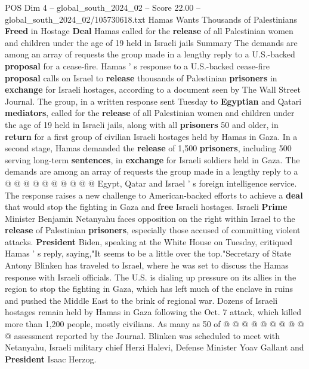 \begin{textsample}{POS Dim 4 – global\_south\_2024\_02 – Score 22.00 – global\_south\_2024\_02/105730618.txt}  \label{ex:f4_pos_077}
Hamas Wants Thousands of Palestinians \textbf{Freed} in Hostage \textbf{Deal} Hamas called for the \textbf{release} of all Palestinian women and children under the age of 19 held in Israeli jails Summary The demands are among an array of requests the group made in a lengthy reply to a U.S.-backed \textbf{proposal} for a cease-fire.
Hamas ' s response to a U.S.-backed cease-fire \textbf{proposal} calls on Israel to \textbf{release} thousands of Palestinian \textbf{prisoners} in \textbf{exchange} for Israeli hostages, according to a document seen by The Wall Street Journal.
The group, in a written response sent Tuesday to \textbf{Egyptian} and Qatari \textbf{mediators}, called for the \textbf{release} of all Palestinian women and children under the age of 19 held in Israeli jails, along with all \textbf{prisoners} 50 and older, in \textbf{return} for a first group of civilian Israeli hostages held by Hamas in Gaza.
In a second stage, Hamas demanded the \textbf{release} of 1,500 \textbf{prisoners}, including 500 serving long-term \textbf{sentences}, in \textbf{exchange} for Israeli soldiers held in Gaza.
The demands are among an array of requests the group made in a lengthy reply to a @ @ @ @ @ @ @ @ @ @ Egypt, Qatar and Israel ' s foreign intelligence service.
The response raises a new challenge to American-backed efforts to achieve a \textbf{deal} that would stop the fighting in Gaza and \textbf{free} Israeli hostages.
Israeli \textbf{Prime} Minister Benjamin Netanyahu faces opposition on the right within Israel to the \textbf{release} of Palestinian \textbf{prisoners}, especially those accused of committing violent attacks. \textbf{President} Biden, speaking at the White House on Tuesday, critiqued Hamas ' s reply, saying,"It seems to be a little over the top."Secretary of State Antony Blinken has traveled to Israel, where he was set to discuss the Hamas response with Israeli officials.
The U.S. is dialing up pressure on its allies in the region to stop the fighting in Gaza, which has left much of the enclave in ruins and pushed the Middle East to the brink of regional war.
Dozens of Israeli hostages remain held by Hamas in Gaza following the Oct. 7 attack, which killed more than 1,200 people, mostly civilians.
As many as 50 of @ @ @ @ @ @ @ @ @ @ assessment reported by the Journal.
Blinken was scheduled to meet with Netanyahu, Israeli military chief Herzi Halevi, Defense Minister Yoav Gallant and \textbf{President} Isaac Herzog.

\end{textsample}
